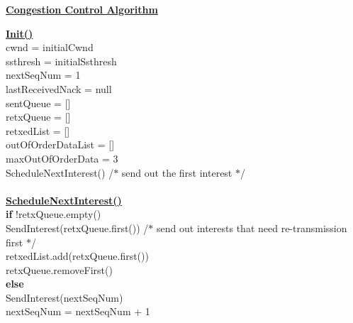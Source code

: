 \documentclass[10pt]{article}
\begin{document}
\vspace{1em}
\underline{\textbf{Congestion Control Algorithm}}\\
\begin{mdframed}
  \underline{\textbf{Init()}}\\
  \-\hspace{1em} cwnd = initialCwnd\\
  \-\hspace{1em} ssthresh = initialSsthresh\\
  \-\hspace{1em} nextSeqNum = 1\\
  \-\hspace{1em} lastReceivedNack = null\\
  \-\hspace{1em} sentQueue = []\\
  \-\hspace{1em} retxQueue = []\\
  \-\hspace{1em} retxedList = []\\
  \-\hspace{1em} outOfOrderDataList = []\\
  \-\hspace{1em} maxOutOfOrderData = 3\\
  \-\hspace{1em} ScheduleNextInterest()  /$*$ send out the first
  interest $*$/ \\\\
  \underline{\textbf{ScheduleNextInterest()}} \\
  \-\hspace{1em} \textbf{if} !retxQueue.empty()\\
  \-\hspace{2em} SendInterest(retxQueue.first()) /$*$ send out interests
  that need re-transmission first $*$/\\
  \-\hspace{2em} retxedList.add(retxQueue.first())\\
  \-\hspace{2em} retxQueue.removeFirst()\\
  \-\hspace{1em} \textbf{else}\\
  \-\hspace{2em} SendInterest(nextSeqNum)\\
  \-\hspace{2em} nextSeqNum = nextSeqNum + 1\\\\

\end{mdframed}
\end{document}
